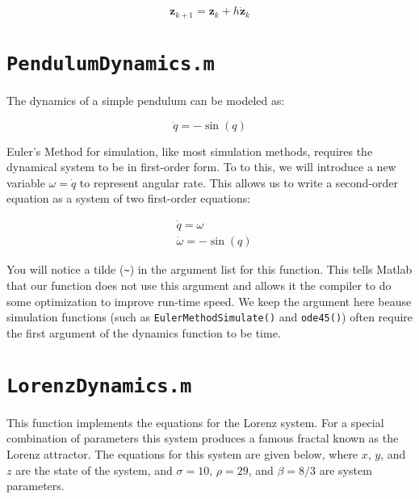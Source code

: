 \begin{equation}
  \bm{z}_{k+1} = \bm{z}_k + h \dot{\bm{z}}_k
\end{equation}



\pagebreak
\section*{\texttt{PendulumDynamics.m}}

The dynamics of a simple pendulum can be modeled as:

\begin{equation}
  \ddot{q} = -\sin(q)
\end{equation}

Euler's Method for simulation, like most simulation methods, requires the dynamical system to be
in first-order form. To to this, we will introduce a new variable $\omega = \dot{q}$ to represent
angular rate. This allows us to write a second-order equation as a system of two first-order equations:

\begin{align}
  &  \dot{q} = \omega \\
  &  \dot{\omega} = -\sin(q)
\end{align}

You will notice a tilde (\texttt{\~}) in the argument list for this function.
This tells Matlab that our function does not use this argument
and allows it the compiler to do some optimization to improve run-time speed.
We keep the argument here beause simulation functions
(such as \texttt{EulerMethodSimulate()} and \texttt{ode45()})
often require the first argument of the dynamics function to be time.



\pagebreak
\section*{\texttt{LorenzDynamics.m}}

This function implements the equations for the Lorenz system. For a special combination of
parameters this system produces a famous fractal known as the Lorenz attractor.
The equations for this system are given below, where $x$, $y$, and $z$ are the state of the
system, and $\sigma=10$, $\rho=29$, and $\beta = 8/3$ are system parameters.

